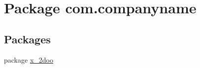 \hypertarget{namespacecom_1_1companyname}{
\section{Package com.companyname}
\label{namespacecom_1_1companyname}
}
\subsection*{Packages}
\begin{CompactItemize}
\item 
package \hyperlink{namespacecom_1_1companyname_1_1x__2doo}{x\_\-2doo}
\end{CompactItemize}
